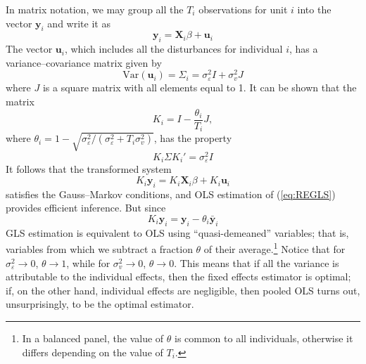 In matrix notation, we may group all the $T_i$ observations for unit
$i$ into the vector $\mathbf{y}_i$ and write it as
\begin{equation}
\label{eq:REvec}
\mathbf{y}_{i} = \mathbf{X}_{i} \beta + \mathbf{u}_i
\end{equation}
The vector $\mathbf{u}_i$, which includes all the disturbances for
individual $i$, has a variance--covariance matrix given by
\begin{equation}
\label{eq:CovMatUnitI}
  \mbox{Var}(\mathbf{u}_i) = \Sigma_i = \sigma^2_{\varepsilon} I + \sigma^2_{v} J
\end{equation}
where $J$ is a square matrix with all elements equal to 1. It can be
shown that the matrix
\[
  K_i = I - \frac{\theta_i}{T_i} J,
\]
where $\theta_i = 1 -
\sqrt{\sigma^2_{\varepsilon}/\left(\sigma^2_{\varepsilon} + T_i
    \sigma^2_{v}\right)}$, has the property
\[
  K_i \Sigma K_i' = \sigma^2_{\varepsilon} I
\]
It follows that the transformed system
\begin{equation}
\label{eq:REGLS}
K_i \mathbf{y}_{i} = K_i \mathbf{X}_{i} \beta + K_i \mathbf{u}_i
\end{equation}
satisfies the Gauss--Markov conditions, and OLS estimation of
(\ref{eq:REGLS}) provides efficient inference. But since 
\[
  K_i \mathbf{y}_{i} = \mathbf{y}_{i} - \theta_i \bar{\mathbf{y}}_{i}
\]
GLS estimation is equivalent to OLS using ``quasi-demeaned''
variables; that is, variables from which we subtract a fraction
$\theta$ of their average.\footnote{In a balanced panel, the value of
  $\theta$ is common to all individuals, otherwise it differs
  depending on the value of $T_i$.} Notice that for
$\sigma^2_{\varepsilon} \to 0$, $\theta \to 1$, while for
$\sigma^2_{v} \to 0$, $\theta \to 0$.  This means that if all the
variance is attributable to the individual effects, then the fixed
effects estimator is optimal; if, on the other hand, individual
effects are negligible, then pooled OLS turns out, unsurprisingly, to
be the optimal estimator.

